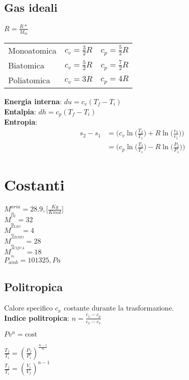 \documentclass[landscape,a4paper]{article}
\begin{document}
\begin{multicols}{4}
\subsection*{Gas ideali}
\(R=\frac {R*}{M_{m}}\) \\
\begin{tabular}{l|c|c}
	Monoatomica & $c_v=\frac{3}{2}R$ & $c_p=\frac{5}{2}R$ \\
	Biatomica & $c_v=\frac{5}{2}R$ & $c_p=\frac{7}{2}R$ \\
	Poliatomica & $c_v=3R$ & $c_p=4R$ \\
\end{tabular}
\textbf{Energia interna}: \(du = c_v(T_f-T_i)\) \\
\textbf{Entalpia}: \(dh = c_p(T_f-T_i)\) \\
\textbf{Entropia}: \begin{align*}
	s_2 - s_1 &= \bigg( c_v \ln \bigg( \frac{T_2}{T_1} \bigg)
	+R \ln \bigg( \frac{v_2}{v_1} \bigg) \bigg) \\
	 &= \bigg( c_p \ln \bigg( \frac{T_2}{T_1} \bigg)
	- R \ln \bigg( \frac{P_2}{P_1} \bigg) \bigg)
\end{align*}

\section*{Costanti}
\begin{multicols}{2}
	\( M_{_{m}}^{aria} = 28.9, \Big [ \frac {Kg}{Kmol} \Big ] \ \)\\
	\( M_{_{m}}^{^{O2}} = 32 \)\\
	\( M_{_{m}}^{^{ELIO}} = 4 \)\\
	\( M_{_{m}}^{^{AZOTO}} = 28 \)\\
	\( M_{_{m}}^{^{ACQUA}} = 18 \)\\
	\( P_{amb} = 101325, Pa \)\\
\end{multicols}

\subsection*{Politropica}
Calore specifico \(c_x\) costante durante la trasformazione. \\
\textbf{Indice politropica}: \(n = \frac{c_x - c_p}{c_x - c_v}\)
	\begin{center}\(Pv^n = \text{cost}\)\end{center}

\begin{multicols}{2}
	\(\frac{T_f}{T_i} = (\frac{P_f}{P_i})^{\frac{n-1}{n}}\) \\
	\(\frac{T_f}{T_i} = (\frac{V_i}{V_f})^{n-1}\)\\
\end{multicols}



\end{multicols}
\end{document}
